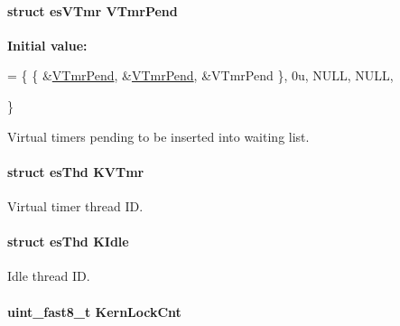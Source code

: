 \hypertarget{group__kern__impl_gac27c4e18276b392295b973fc00f31765}{
\paragraph[{V\-Tmr\-Pend}]{\setlength{\rightskip}{0pt plus 5cm}struct {\bf es\-V\-Tmr} V\-Tmr\-Pend\hspace{0.3cm}{\ttfamily [static]}}}\label{group__kern__impl_gac27c4e18276b392295b973fc00f31765}
{\bfseries Initial value\-:}
\begin{DoxyCode}
= \{
   \{
        &\hyperlink{group__kern__impl_gac27c4e18276b392295b973fc00f31765}{VTmrPend},
        &\hyperlink{group__kern__impl_gac27c4e18276b392295b973fc00f31765}{VTmrPend},
        &VTmrPend
   \},
   0u,
   NULL,
   NULL,



\}
\end{DoxyCode}


Virtual timers pending to be inserted into waiting list. 

\hypertarget{group__kern__impl_gaab82048477ffd940e6eff13d4280eb72}{
\paragraph[{K\-V\-Tmr}]{\setlength{\rightskip}{0pt plus 5cm}struct {\bf es\-Thd} K\-V\-Tmr\hspace{0.3cm}{\ttfamily [static]}}}\label{group__kern__impl_gaab82048477ffd940e6eff13d4280eb72}


Virtual timer thread I\-D. 

\hypertarget{group__kern__impl_ga639ded61b40c01f4a1f54814c4b94513}{
\paragraph[{K\-Idle}]{\setlength{\rightskip}{0pt plus 5cm}struct {\bf es\-Thd} K\-Idle\hspace{0.3cm}{\ttfamily [static]}}}\label{group__kern__impl_ga639ded61b40c01f4a1f54814c4b94513}


Idle thread I\-D. 

\hypertarget{group__kern__impl_gad8535f99414ea3e0e37a91fd6600246e}{
\paragraph[{Kern\-Lock\-Cnt}]{\setlength{\rightskip}{0pt plus 5cm}uint\-\_\-fast8\-\_\-t Kern\-Lock\-Cnt\hspace{0.3cm}{\ttfamily [static]}}}\label{group__kern__impl_gad8535f99414ea3e0e37a91fd6600246e}


